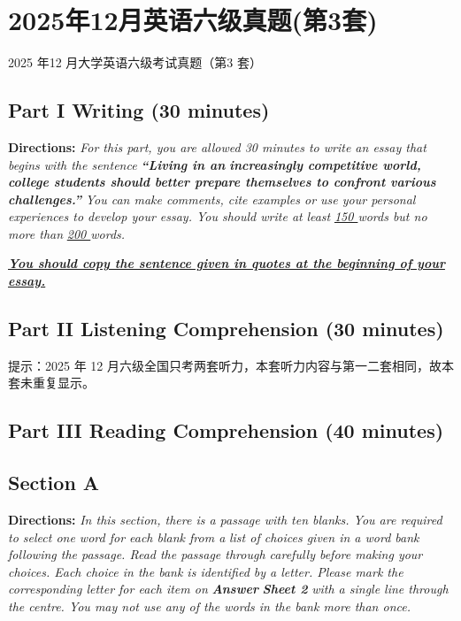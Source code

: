 \documentclass[UTF8,11pt]{ctexart}
\begin{document}
\section*{2025年12月英语六级真题(第3套)}
2025 年12 月大学英语六级考试真题（第3 套）


\subsection*{\textbf{Part I Writing} \textbf{(30 minutes)}}


\textbf{Directions:}\textit{ For this part, you are allowed 30 minutes to write an essay that begins with the sentence }\textbf{\textit{“Living in an}} \textbf{\textit{increasingly competitive world, college students should better prepare themselves to confront various challenges.”}} \textit{You can make comments, cite examples or use your personal experiences to develop your essay. You should write at} \textit{least }\textit{\uline{150 }}\textit{words but no more than }\textit{\uline{200 }}\textit{words.}


\textbf{\textit{\uline{You should copy the sentence given in quotes at the beginning of your essay.}}}


\subsection*{\textbf{Part II} \textbf{Listening Comprehension} \textbf{(30 minutes)}}


提示：2025 年 12 月六级全国只考两套听力，本套听力内容与第一二套相同，故本套未重复显示。


\subsection*{\textbf{Part III Reading Comprehension (40 minutes)}}


\subsection*{\textbf{Section A}}


\textbf{Directions:} \textit{In this section, there is a passage with ten blanks. You are required to select one word for each blank from a} \textit{list of choices given in a word bank following the passage. Read the passage through carefully before making your} \textit{choices. Each choice in the bank is identified by a letter. Please mark the corresponding letter for each item on }\textbf{\textit{Answer}} \textbf{\textit{Sheet 2}}\textit{ with a single line through the centre. You may not use any of the words in the bank more than once.}
\end{document}
